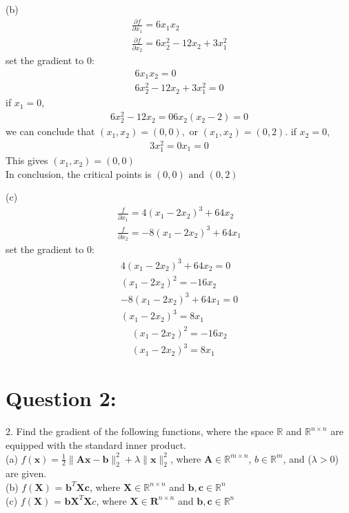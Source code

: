 \documentclass[a4paper,12pt]{article}
\newcommand{\R}{\mathbb{R}}
\begin{document}
(b) 
\begin{align*}
    \frac{\partial f}{\partial x_1} = 6x_1x_2 \\
    \frac{\partial f}{\partial x_2} = 6x_2^2 - 12x_2 + 3x_1^2 
\end{align*}
set the gradient to 0:
\begin{align*}
    6x_1x_2 = 0 \\
    6x_2^2 - 12x_2 + 3x_1^2 = 0
\end{align*}
if \(x_1 = 0\), 
\begin{align*}
    6x_2^2 - 12x_2 = 0
    6x_2(x_2 - 2) = 0
\end{align*}
we can conclude that \((x_1 ,x_2) = (0, 0), \text{ or } (x_1 ,x_2) = (0, 2).\)
if \(x_2 = 0\), 
\begin{align*}
    3x_1^2 = 0
    x_1 = 0
\end{align*}
This gives \((x_1, x_2) = (0, 0)\) \\
In conclusion, the critical points is \((0, 0) \text{ and }(0, 2)\)

(c)
\begin{align*}
    \frac{f}{\partial x_1} = 4(x_1 - 2x_2)^3 + 64x_2 \\
    \frac{f}{\partial x_2} = -8(x_1 - 2x_2)^3 + 64x_1
\end{align*}
set the gradient to 0:
\begin{align*}
    4(x_1 - 2x_2)^3 + 64x_2 = 0 \\
    (x_1 - 2x_2)^2 = -16x_2 \\
    -8(x_1 - 2x_2)^3 + 64x_1 = 0 \\
    (x_1 - 2x_2)^3 = 8x_1
\end{align*}
\begin{align*} 
    (x_1 - 2x_2)^2 = -16x_2 \\
    (x_1 - 2x_2)^3 = 8x_1
\end{align*}





\section*{Question 2:}
2. Find the gradient of the following functions, where the space \(\R\) and \(\R^{n \times n}\) are equipped with the standard inner product. \\
(a) \(f(\bm{x}) = \frac{1}{2} \|\bm{A}\bm{x} - \bm{b}\|_2^2 + \lambda\|\bm{x}\|_2^2\), where \(\bm{A} \in \R^{m \times n}\), \(b \in \R^m\), and (\(\lambda > 0\)) are given. \\
(b) \(f(\bm{X})\) = \(\bm{b}^T\bm{X}\bm{c}\), where \(\bm{X} \in \R^{n \times n}\) and \(\bm{b}, \bm{c} \in \R^n\) \\
(c) \(f(\bm{X})\) = \(\bm{b}\bm{X}^T\bm{X}c\), where \(\bm{X} \in \bm{R}^{n \times n}\) and \(\bm{b}, \bm{c} \in \R^n\) 
\end{document}
